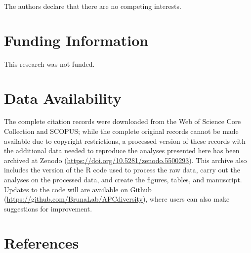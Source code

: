\documentclass[
  english,
  man]{apa6}
\begin{document}
The authors declare that there are no competing interests.

\hypertarget{funding-information}{%
\section{Funding Information}\label{funding-information}}

This research was not funded.

\hypertarget{data-availability}{%
\section{Data Availability}\label{data-availability}}

The complete citation records were downloaded from the Web of Science Core Collection and SCOPUS; while the complete original records cannot be made available due to copyright restrictions, a processed version of these records with the additional data needed to reproduce the analyses presented here has been archived at Zenodo (\url{https://doi.org/10.5281/zenodo.5500293}). This archive also includes the version of the R code used to process the raw data, carry out the analyses on the processed data, and create the figures, tables, and manuscript. Updates to the code will are available on Github (\url{https://github.com/BrunaLab/APCdiversity}), where users can also make suggestions for improvement.

\newpage

\hypertarget{references}{%
\section{References}\label{references}}

\begingroup
\setlength{\parindent}{-0.5in}
\setlength{\leftskip}{0.5in}
\end{document}
